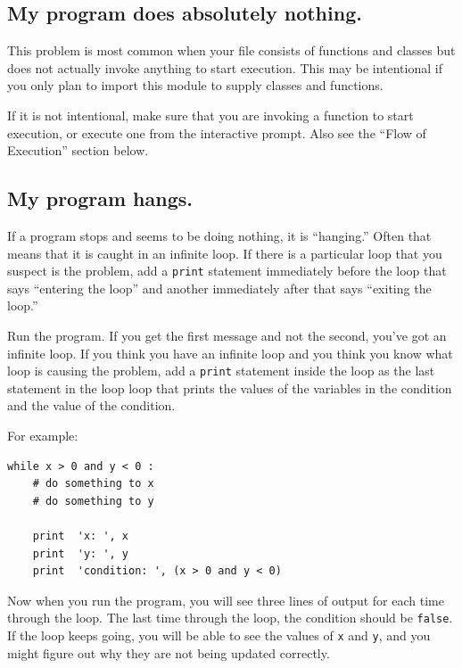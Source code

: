 \documentclass[10pt]{book}
\begin{document}
\subsection{My program does absolutely nothing.}

This problem is most common when your file consists of functions and
classes but does not actually invoke anything to start execution.
This may be intentional if you only plan to import this module to
supply classes and functions.

If it is not intentional, make sure that you
are invoking a function to start execution, or execute one from
the interactive prompt.  Also see the ``Flow of Execution'' section
below.


\subsection{My program hangs.}

If a program stops and seems to be doing nothing, it is ``hanging.''
Often that means that it is caught in an infinite loop.  
If there is a particular loop that you suspect is the
problem, add a {\tt print} statement immediately before the loop that says
``entering the loop'' and another immediately after that says
``exiting the loop.''


Run the program.  If you get the first message and not the second,
you've got an infinite loop.  
If you think you have an infinite loop and you think you know
what loop is causing the problem, add a {\tt print} statement 
inside the loop as the last statement in the loop
loop that prints the values of the variables in
the condition and the value of the condition.

For example:

\beforeverb
\begin{verbatim}
while x > 0 and y < 0 :
    # do something to x
    # do something to y

    print  'x: ', x
    print  'y: ', y
    print  'condition: ', (x > 0 and y < 0)
\end{verbatim}
\afterverb
%
Now when you run the program, you will see three lines of output
for each time through the loop.  The last time through the
loop, the condition should be {\tt false}.  If the loop keeps
going, you will be able to see the values of {\tt x} and {\tt y},
and you might figure out why they are not being updated correctly.
\end{document}
